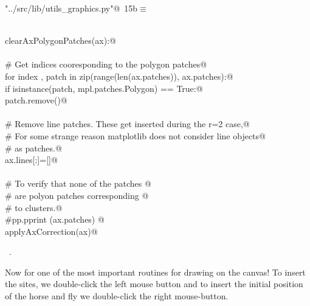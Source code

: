 \documentclass[11.5pt]{report}
\begin{document}
\begin{flushleft} \small\label{scrap6}\raggedright\small
{} \verb@"../src/lib/utils_graphics.py"@\nobreak\ {\footnotesize {15b}}$\equiv$
\vspace{-1ex}
\begin{list}{}{} \item
\mbox{}\verb@@\\
\mbox{}\verb@def clearAxPolygonPatches(ax):@\\
\mbox{}\verb@@\\
\mbox{}\verb@    # Get indices cooresponding to the polygon patches@\\
\mbox{}\verb@    for index , patch in zip(range(len(ax.patches)), ax.patches):@\\
\mbox{}\verb@        if isinstance(patch, mpl.patches.Polygon) == True:@\\
\mbox{}\verb@            patch.remove()@\\
\mbox{}\verb@@\\
\mbox{}\verb@    # Remove line patches. These get inserted during the r=2 case,@\\
\mbox{}\verb@    # For some strange reason matplotlib does not consider line objects@\\
\mbox{}\verb@    # as patches.@\\
\mbox{}\verb@    ax.lines[:]=[]@\\
\mbox{}\verb@@\\
\mbox{}\verb@    # To verify that none of the patches @\\
\mbox{}\verb@    # are polyon patches corresponding @\\
\mbox{}\verb@    # to clusters.@\\
\mbox{}\verb@    #pp.pprint (ax.patches) @\\
\mbox{}\verb@    applyAxCorrection(ax)@\\
\mbox{}\verb@@{\NWsep}
\end{list}
\vspace{-1.5ex}
\footnotesize
\begin{list}{}{\setlength{\itemsep}{-\parsep}\setlength{\itemindent}{-\leftmargin}}
\item \NWtxtFileDefBy\ .

\item{}
\end{list}
\vspace{4ex}
\end{flushleft}
\newchunk Now for one of the most important routines for drawing on the canvas! 
To insert the sites, we double-click the left mouse button and to insert the 
initial position of the horse and fly we double-click the right mouse-button. 
\end{document}
